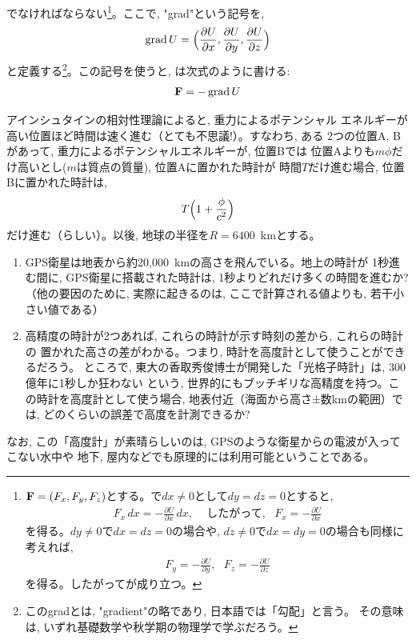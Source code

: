 でなければならない\footnote{
${\bf F}=(F_x, F_y, F_z)$とする。で$dx\ne0$として$dy=dz=0$とすると, 
\begin{eqnarray*}F_x\,dx=-\frac{\partial U}{\partial x}\,dx,\,\,\,\,\,\,\,\text{したがって, }\,\,\,F_x=-\frac{\partial U}{\partial x}\end{eqnarray*}
を得る。$dy\ne0$で$dx=dz=0$の場合や, $dz\ne0$で$dx=dy=0$の場合も同様に考えれば, 
\begin{eqnarray*}F_y=-\frac{\partial U}{\partial y},\,\,\,\,F_z=-\frac{\partial U}{\partial z}\end{eqnarray*}
を得る。したがってが成り立つ。}。ここで, "grad"という記号を, 
\begin{eqnarray}
\operatorname{grad} U=\Bigl(\frac{\partial U}{\partial x}, \frac{\partial U}{\partial y}, \frac{\partial U}{\partial z}\Bigr)
\end{eqnarray}
と定義する\footnote{このgradとは, "gradient"の略であり, 日本語では「勾配」と言う。
その意味は, いずれ基礎数学や秋学期の物理学で学ぶだろう。}。この記号を使うと, 
は次式のように書ける:
\begin{eqnarray} 
{\bf F}=-\operatorname{grad} U\label{eq:F_gradU2}
\end{eqnarray} 
\hv

\begin{exq} アインシュタインの相対性理論によると, 重力によるポテンシャル
エネルギーが高い位置ほど時間は速く進む（とても不思議!）。すなわち, ある
2つの位置A, Bがあって, 重力によるポテンシャルエネルギーが, 位置Bでは
位置Aよりも$m\phi$だけ高いとし($m$は質点の質量), 位置Aに置かれた時計が
時間$T$だけ進む場合, 位置Bに置かれた時計は, 
\begin{eqnarray}
T\Bigl(1+\frac{\phi}{c^2}\Bigr)
\end{eqnarray}
だけ進む（らしい）。以後, 地球の半径を$R=6400$~kmとする。
\begin{enumerate}
\item GPS衛星は地表から約20,000~kmの高さを飛んでいる。地上の時計が
1秒進む間に, GPS衛星に搭載された時計は, 1秒よりどれだけ多くの時間を進むか? 
（他の要因のために, 実際に起きるのは, ここで計算される値よりも, 若干小さい値である）
\item 高精度の時計が2つあれば, これらの時計が示す時刻の差から, これらの時計の
置かれた高さの差がわかる。つまり, 時計を高度計として使うことができるだろう。
ところで, 東大の香取秀俊博士が開発した「光格子時計」は, 300億年に1秒しか狂わない
という, 世界的にもブッチギリな高精度を持つ。この時計を高度計として使う場合, 
地表付近（海面から高さ±数kmの範囲）では, どのくらいの誤差で高度を計測できるか?
\end{enumerate}
\end{exq}
なお, この「高度計」が素晴らしいのは, GPSのような衛星からの電波が入ってこない水中や
地下, 屋内などでも原理的には利用可能ということである。\\



